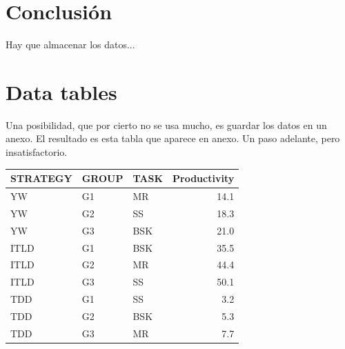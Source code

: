 \documentclass{article}\usepackage[]{graphicx}\usepackage[]{color}
\begin{document}
\section{Conclusi\'on}

Hay que almacenar los datos...

\FloatBarrier

\appendix

\section{Data tables}

Una posibilidad, que por cierto no se usa mucho, es guardar los datos en un anexo. El resultado es esta tabla que aparece en anexo. Un paso adelante, pero insatisfactorio.

\vspace{1cm}


\begin{tabular}{l|l|l|r}
\hline
STRATEGY & GROUP & TASK & Productivity\\
\hline
YW & G1 & MR & 14.1\\
\hline
YW & G2 & SS & 18.3\\
\hline
YW & G3 & BSK & 21.0\\
\hline
ITLD & G1 & BSK & 35.5\\
\hline
ITLD & G2 & MR & 44.4\\
\hline
ITLD & G3 & SS & 50.1\\
\hline
TDD & G1 & SS & 3.2\\
\hline
TDD & G2 & BSK & 5.3\\
\hline
TDD & G3 & MR & 7.7\\
\hline
\end{tabular}
\end{document}
